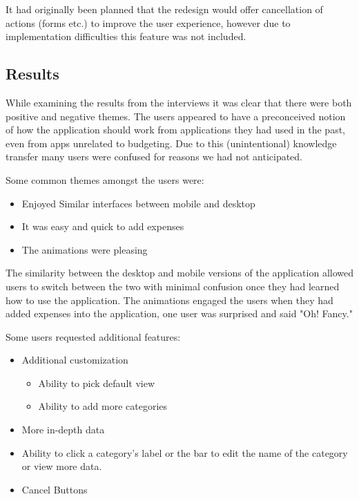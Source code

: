 \documentclass{chi2011}
\begin{document}
        It had originally been planned that the redesign would offer cancellation
        of actions (forms etc.) to improve the user experience, however due to
        implementation difficulties this feature was not included.

	\subsection{Results}

	While examining the results from the interviews it was clear that there were both positive and 
	negative themes. The users appeared to have a preconceived notion of how the application should
	work from applications they had used in the past, even from apps unrelated to budgeting. Due to this
	(unintentional) knowledge transfer many users were confused for reasons we had not anticipated.
	
	Some common themes amongst the users were:
	\begin{itemize}[noitemsep]
		\item Enjoyed Similar interfaces between mobile and desktop
		\item It was easy and quick to add expenses
		\item The animations were pleasing
	\end{itemize}

        The similarity between the desktop and mobile versions of the application
        allowed users to switch between the two with minimal confusion once they had
        learned how to use the application. The animations engaged the users when they
        had added expenses into the application, one user was surprised and said "Oh!
        Fancy."

        Some users requested additional features:
	\begin{itemize}[noitemsep]
		\item Additional customization
		\begin{itemize}[noitemsep]
			\item Ability to pick default view
			\item Ability to add more categories
		\end{itemize}
		\item More in-depth data 
		\item Ability to click a category's label or the bar to edit the name of the category or view more data. 
		\item Cancel Buttons
	\end{itemize}
	
\end{document}
